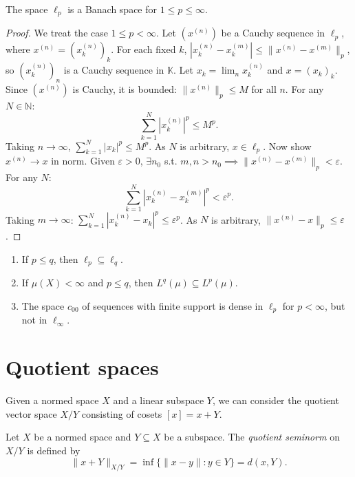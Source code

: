 \begin{theorem}
\label{theorem-lp-completeness}
The space $\ell_p$ is a Banach space for $1
\leq p \leq \infty$.
\end{theorem}

\begin{proof}
We treat the case $1 \leq p < \infty$. Let
$(x^{(n)})$ be a Cauchy sequence in $\ell_p$,
where $x^{(n)} = (x_k^{(n)})_k$. For each
fixed $k$, $|x_k^{(n)} - x_k^{(m)}| \leq
\|x^{(n)} - x^{(m)}\|_p$, so $(x_k^{(n)})_n$
is a Cauchy sequence in $\mathbb{K}$. Let
$x_k = \lim_n x_k^{(n)}$ and $x = (x_k)_k$.
Since $(x^{(n)})$ is Cauchy, it is bounded:
$\|x^{(n)}\|_p \leq M$ for all $n$. For any
$N \in \mathbb{N}$:
$$
\sum_{k=1}^N |x_k^{(n)}|^p \leq M^p.
$$
Taking $n \to \infty$, $\sum_{k=1}^N |x_k|^p
\leq M^p$. As $N$ is arbitrary, $x \in
\ell_p$. Now show $x^{(n)} \to x$ in norm.
Given $\varepsilon > 0$, $\exists n_0$ s.t.
$m, n > n_0 \implies \|x^{(n)} - x^{(m)}\|_p
< \varepsilon$. For any $N$:
$$
\sum_{k=1}^N |x_k^{(n)} - x_k^{(m)}|^p <
\varepsilon^p.
$$
Taking $m \to \infty$: $\sum_{k=1}^N
|x_k^{(n)} - x_k|^p \leq \varepsilon^p$. As
$N$ is arbitrary, $\|x^{(n)} - x\|_p \leq
\varepsilon$.
\end{proof}

\begin{remark}
\label{remark-lp-inclusions}
\begin{enumerate}
\item If $p \leq q$, then $\ell_p \subseteq
\ell_q$.
\item If $\mu(X) < \infty$ and $p \leq q$,
then $L^q(\mu) \subseteq L^p(\mu)$.
\item The space $c_{00}$ of sequences with
finite support is dense in $\ell_p$ for $p <
\infty$, but not in $\ell_\infty$.
\end{enumerate}
\end{remark}


\section{Quotient spaces}
\label{section-quotient-spaces}

Given a normed space $X$ and a linear
subspace $Y$, we can consider the quotient
vector space $X/Y$ consisting of cosets $[x]
= x + Y$.

\begin{definition}
\label{definition-quotient-norm}
Let $X$ be a normed space and $Y \subseteq X$
be a subspace. The {\it quotient seminorm} on
$X/Y$ is defined by
$$
\|x+Y\|_{X/Y} = \inf \{ \|x-y\| : y \in Y \}
= d(x, Y).
$$
\end{definition}

